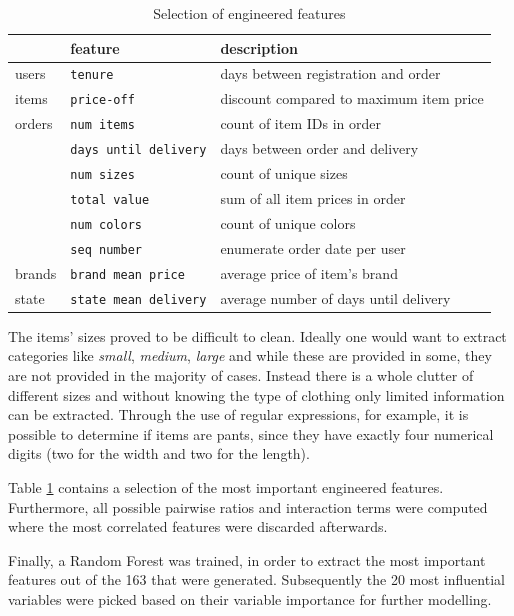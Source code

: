 \begin{table}
\centering
\caption{Selection of engineered features}
\tiny
\label{features-tab}
\begin{tabular}{@{}lll@{}}
       & feature             & description                           \\ \midrule
users  & \texttt{tenure}              & days between registration and order        \\
items  & \texttt{price-off}           & discount compared to maximum item price    \\
orders & \texttt{num items}           & count of item IDs in order                 \\
       & \texttt{days until delivery} & days between order and delivery            \\
       & \texttt{num sizes}           & count of unique sizes                      \\
       & \texttt{total value}         & sum of all item prices in order            \\
       & \texttt{num colors}          & count of unique colors                     \\
       & \texttt{seq number}          & enumerate order date per user              \\
brands & \texttt{brand mean price}    & average price of item's brand              \\
state  & \texttt{state mean delivery} & average number of days until delivery
\end{tabular}
\end{table}

The items' sizes proved to be difficult to clean. Ideally one would want to extract categories like \textit{small}, \textit{medium}, \textit{large} and while these are provided in some, they are not provided in the majority of cases. Instead there is a whole clutter of different sizes and without knowing the type of clothing only limited information can be extracted. Through the use of regular expressions, for example, it is possible to determine if items are pants, since they have exactly four numerical digits (two for the width and two for the length).

Table \ref{features-tab} contains a selection of the most important engineered features. Furthermore, all possible pairwise ratios and interaction terms were computed where the most correlated features were discarded afterwards.

Finally, a Random Forest was trained, in order to extract the most important features out of the 163 that were generated. Subsequently the 20 most influential variables were picked based on their variable importance for further modelling.